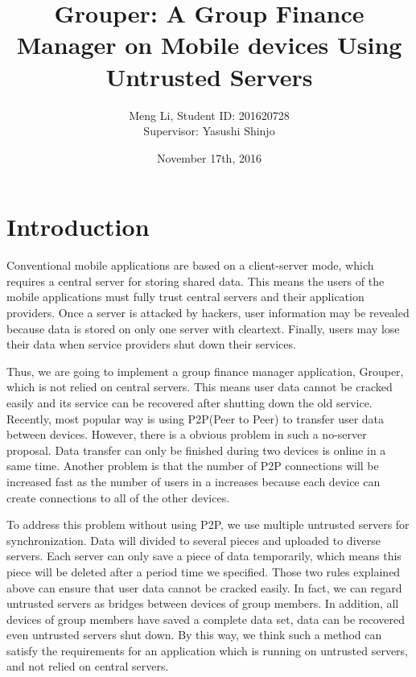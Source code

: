 \documentclass[twocolumn,10pt]{article}
\begin{document}
\date{November 17th, 2016}

\title{\bf Grouper: A Group Finance Manager on Mobile devices Using Untrusted Servers}

\author{
	Meng Li, Student ID: 201620728  
	\\ Supervisor: Yasushi Shinjo
}

\maketitle

\section{Introduction}
Conventional mobile applications are based on a client-server mode, which requires a central server for storing shared data. This means the users of the mobile applications must fully trust central servers and their application providers. Once a server is attacked by hackers, user information may be revealed because data is stored on only one server with cleartext. Finally, users may lose their data when service providers shut down their services.

Thus, we are going to implement a group finance manager application, Grouper, which is not relied on central servers. This means user data cannot be cracked easily and its service can be recovered after shutting down the old service. Recently, most popular way is using P2P(Peer to Peer) to transfer user data between devices. However, there is a obvious problem in such a no-server proposal. Data transfer can only be finished during two devices is online in a same time. Another problem is that the number of P2P connections will be increased fast as the number of users in a increases because each device can create  connections to all of the other devices. 

To address this problem without using P2P, we use multiple untrusted servers for synchronization. Data will divided to several pieces and uploaded to diverse servers. Each server can only save a piece of data temporarily, which means this piece will be deleted after a period time we specified. Those two rules explained above can ensure that user data cannot be cracked easily. In fact, we can regard untrusted servers as bridges between devices of group members. In addition, all devices of group members have saved a complete data set, data can be recovered even untrusted servers shut down. By this way, we think such a method can satisfy the requirements for an application which is running on untrusted servers, and not relied on central servers.
\end{document}
